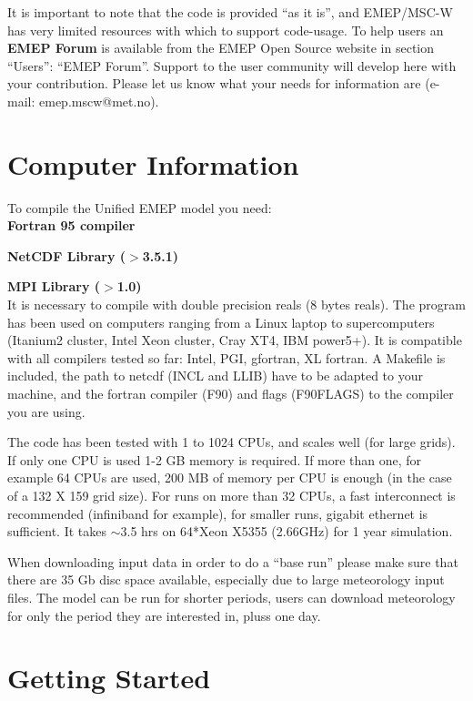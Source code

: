 \noindent It is important to note that the code is provided ``as it is'', 
and EMEP/MSC-W has very limited resources with which to support
code-usage. To help users an {\bf EMEP Forum} is available from the
EMEP Open Source website in section ``Users'': ``EMEP Forum''. 
Support to the user community will develop here with your
contribution. 
Please let us know what your needs for information are 
(e-mail: emep.mscw@met.no).

\newpage

\section{Computer Information}
\label{sec:compinf}

To compile the Unified EMEP model you need:\\

\textbf{Fortran 95 compiler}

\textbf{NetCDF Library ($>$3.5.1)}

\textbf{MPI Library ($>$1.0)}\\

It is necessary to compile with double precision reals (8 bytes
reals). The program has been used on computers ranging from a Linux laptop to supercomputers 
(Itanium2 cluster, Intel Xeon cluster, Cray XT4, IBM power5+). It is compatible with all 
compilers tested so far:  Intel, PGI, gfortran, XL fortran. A Makefile is included,  
the path to netcdf (INCL and LLIB) have to be adapted to your machine, and the fortran 
compiler (F90) and flags (F90FLAGS) to the compiler you are using.



The code has been tested with 1 to 1024 CPUs, and scales well (for large grids).  If only one 
CPU is used 1-2 GB memory is required. If more than one,
for example 64 CPUs are used, 200 MB of memory per CPU is enough (in
the case of a 132 X 159 grid size). For runs on more than 32 CPUs, a fast interconnect is 
recommended (infiniband for example), for smaller runs, gigabit ethernet is sufficient. 
It takes $\sim$3.5 hrs on 64*Xeon X5355 (2.66GHz) for 1 year simulation.

When downloading input data in order to do a ``base run'' please make
sure that there are 35 Gb disc space available, especially due to
large meteorology input files. The model can be run for shorter periods, users 
can download meteorology for only the period they are interested in, pluss one day. 
 

\section{Getting Started}


